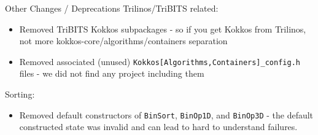 \begin{frame}[fragile]{Other Changes / Deprecations}
   Trilinos/TriBITS related:
   \begin{itemize}
      \item Removed TriBITS Kokkos subpackages - so if you get Kokkos from Trilinos, not more kokkos-core/algorithms/containers separation
      \item Removed associated (unused) \texttt{Kokkos[Algorithms,Containers]\_config.h} files - we did not find any project including them
   \end{itemize}

   Sorting:
   \begin{itemize}
      \item Removed default constructors of \texttt{BinSort}, \texttt{BinOp1D}, and \texttt{BinOp3D} - the default constructed state was invalid and can lead to hard to understand failures.
   \end{itemize}
  
\end{frame}

